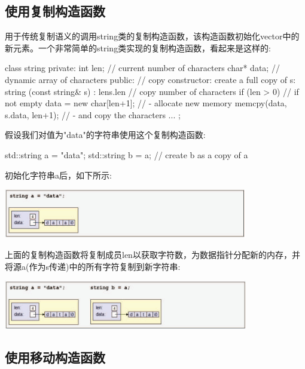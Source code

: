 \subsection{使用复制构造函数}

用于传统复制语义的调用string类的复制构造函数，该构造函数初始化vector中的新元素。一个非常简单的string类实现的复制构造函数，看起来是这样的:

\begin{cppcode}
class string {
	private:
	int len; // current number of characters
	char* data; // dynamic array of characters
	public:
	// copy constructor: create a full copy of s:
	string (const string& s)
	: len{s.len} { // copy number of characters
		if (len > 0) { // if not empty
			data = new char[len+1]; // - allocate new memory
			memcpy(data, s.data, len+1); // - and copy the characters
		}
	}
	...
};
\end{cppcode}

假设我们对值为"data"的字符串使用这个复制构造函数:

\begin{cppcode}
std::string a = "data";
std::string b = a; // create b as a copy of a
\end{cppcode}

初始化字符串a后，如下所示:

\begin{center}
	\includegraphics[width=0.8\textwidth]{part1/ch1/images/18}
\end{center}

上面的复制构造函数将复制成员len以获取字符数，为数据指针分配新的内存，并将源a(作为s传递)中的所有字符复制到新字符串:

\begin{center}
	\includegraphics[width=0.8\textwidth]{part1/ch1/images/19}
\end{center}

\subsection{使用移动构造函数}

